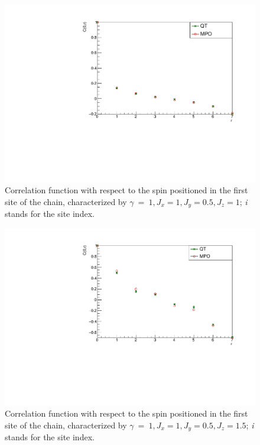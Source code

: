 \begin{figure}[H]
    \centering
    \includegraphics[scale=0.7]{Figures/8sites/CorrFunc1_8s_J1051.pdf}
    \caption{Correlation function with respect to the spin positioned in the first site of the chain, characterized by $\gamma~=~1, J_x=1, J_y=0.5, J_z=1$; \emph{i} stands for the site index.}
    \label{fig:my_label}
\end{figure}

\begin{figure}[H]
    \centering
    \includegraphics[scale=0.7]{Figures/8sites/CorrFunc1_8s_J10515.pdf}
    \caption{Correlation function with respect to the spin positioned in the first site of the chain, characterized by $\gamma~=~1, J_x=1, J_y=0.5, J_z=1.5$; \emph{i} stands for the site index.}
    \label{fig:my_label}
\end{figure}

